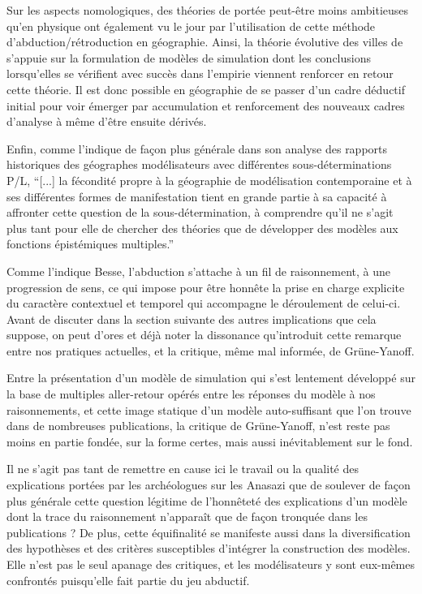 Sur les aspects nomologiques, des théories de portée peut-être moins ambitieuses qu'en physique ont également vu le jour par l'utilisation de cette méthode d'abduction/rétroduction en géographie. Ainsi, la théorie évolutive des villes de \textcite{Pumain1997} s'appuie sur la formulation de modèles de simulation dont les conclusions lorsqu'elles se vérifient avec succès dans l'empirie viennent renforcer en retour cette théorie. Il est donc possible en géographie de se passer d'un cadre déductif initial pour voir émerger par accumulation et renforcement des nouveaux cadres d'analyse à même d'être ensuite dérivés.

Enfin, comme l'indique de façon plus générale \textcite{Varenne2014} dans son analyse des rapports historiques des géographes modélisateurs avec différentes sous-déterminations P/L, \enquote{[...] la fécondité propre à la géographie de modélisation contemporaine et à ses différentes formes de manifestation tient en grande partie à sa capacité à affronter cette question de la sous-détermination, à comprendre qu’il ne s’agit plus tant pour elle de chercher des théories que de développer des modèles aux fonctions épistémiques multiples.}


Comme l'indique Besse, l'abduction s'attache à un fil de raisonnement, à une progression de sens, ce qui impose pour être honnête la prise en charge explicite du caractère contextuel et temporel qui accompagne le déroulement de celui-ci. Avant de discuter dans la section suivante des autres implications que cela suppose, on peut d'ores et déjà noter la dissonance qu'introduit cette remarque entre nos pratiques actuelles, et la critique, même mal informée, de Grüne-Yanoff.

Entre la présentation d'un modèle de simulation qui s'est lentement développé sur la base de multiples aller-retour opérés entre les réponses du modèle à nos raisonnements, et cette image statique d'un modèle auto-suffisant que l'on trouve dans de nombreuses publications, la critique de Grüne-Yanoff, n'est reste pas moins en partie fondée, sur la forme certes, mais aussi inévitablement sur le fond.

Il ne s'agit pas tant de remettre en cause ici le travail ou la qualité des explications portées par les archéologues sur les Anasazi que de soulever de façon plus générale cette question légitime de l'honnêteté des explications d'un modèle dont la trace du raisonnement n'apparaît que de façon tronquée dans les publications ? De plus, cette équifinalité se manifeste aussi dans la diversification des hypothèses et des critères susceptibles d'intégrer la construction des modèles. Elle n'est pas le seul apanage des critiques, et les modélisateurs y sont eux-mêmes confrontés puisqu'elle fait partie du jeu abductif.

